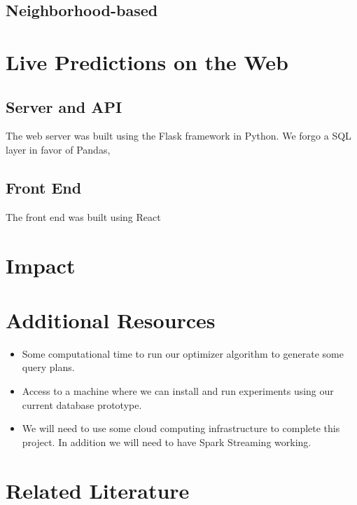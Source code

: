 \documentclass{proc}
\begin{document}
\subsection{Neighborhood-based}


\section{Live Predictions on the Web}


\subsection{Server and API}
The web server was built using the Flask framework in Python. We forgo a SQL layer in favor of Pandas, 

\subsection{Front End}
The front end was built using React

\section{Impact}



\section{Additional Resources}

\begin{itemize}
  \item Some computational time to run our optimizer algorithm to generate some query plans.
  \item Access to a machine where we can install and run experiments using our current database prototype.
  \item We will need to use some cloud computing infrastructure to complete this project. In addition we will need to have Spark Streaming working.
 \end{itemize}
 
\section{Related Literature}
\end{document}
